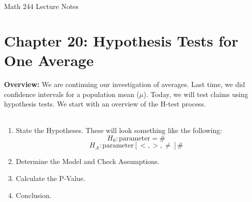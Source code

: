 \documentclass[12pt]{amsart}
\date{}
\theoremstyle{definition}
\begin{document}
\newcommand{\ph}{\phantom}
\newcommand{\ds}{\displaystyle}

\renewcommand{\emph}{\textbf}
\onehalfspace


\fancyhf{}   %
\renewcommand{\headrulewidth}{0.4pt} %
\fancyfootoffset[LE,LO]{0in}        %
\renewcommand{\footrulewidth}{0.4pt} %




\begin{center}

	\larger[3]	Math 244 Lecture Notes \smaller[3]		\\[22pt]

\end{center}

\section*{Chapter 20: Hypothesis Tests for One Average}




 \textbf{Overview:} We are continuing our investigation of averages. Last time, we did confidence intervals for a population mean ($\mu$). Today, we will test claims using hypothesis tests. We start with an overview of the H-test process.\\
 ~\\
  \begin{framed}
 \begin{enumerate}
 	\item State the Hypotheses. These will look something like the following: $$H_0:\text{parameter}=\#$$ $$H_A:\text{parameter} [<,>,\neq]\#$$
 	\item Determine the Model and Check Assumptions. 
 	\item Calculate the P-Value.
 	\item Conclusion. \end{enumerate}
 \end{framed}
 
\end{document}
